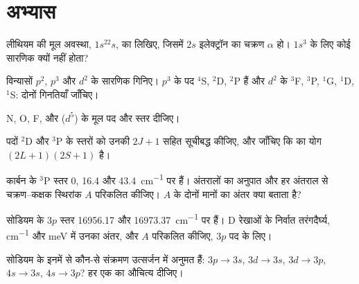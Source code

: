 \section{अभ्यास}

\begin{exercise}[$\star$]\label{exo:b3:many-electron-atoms:1}
लीथियम की मूल अवस्था, $1s^22s$, का  लिखिए, जिसमें
$2s$ इलेक्ट्रॉन का चक्रण $\alpha$ हो। $1s^3$ के लिए कोई सारणिक क्यों
नहीं होता?
\end{exercise}

\begin{exercise}[$\star$]\label{exo:b3:many-electron-atoms:2}
विन्यासों $p^2$, $p^3$ और $d^2$ के सारणिक गिनिए। $p^3$ के पद
${}^4$S, ${}^2$D, ${}^2$P हैं और $d^2$ के ${}^3$F, ${}^3$P, ${}^1$G,
${}^1$D, ${}^1$S: दोनों गिनतियाँ जाँचिए।
\end{exercise}

\begin{exercise}[$\star$]\label{exo:b3:many-electron-atoms:3}
N, O, F,  और  ($d^5$) के मूल पद और स्तर दीजिए।
\end{exercise}

\begin{exercise}[$\star$]\label{exo:b3:many-electron-atoms:4}
पदों ${}^2$D और ${}^3$P के स्तरों को उनकी  $2J+1$ सहित सूचीबद्ध कीजिए,
और जाँचिए कि  का योग $(2L+1)(2S+1)$ है।
\end{exercise}

\begin{exercise}[$\star\star$]\label{exo:b3:many-electron-atoms:5}
कार्बन के ${}^3$P स्तर 0, 16.4 और \qty{43.4}{cm^{-1}} पर हैं। अंतरालों का
अनुपात और हर अंतराल से चक्रण--कक्षक स्थिरांक $A$ परिकलित कीजिए।
$A$ के दोनों मानों का अंतर क्या बताता है?
\end{exercise}

\begin{exercise}[$\star\star$]\label{exo:b3:many-electron-atoms:6}
सोडियम के $3p$ स्तर 16956.17 और \qty{16973.37}{cm^{-1}} पर हैं।
D रेखाओं के निर्वात तरंगदैर्घ्य, \unit{cm^{-1}} और
\unit{meV} में उनका अंतर, और $A$ परिकलित कीजिए, $3p$ पद के लिए।
\end{exercise}

\begin{exercise}[$\star\star$]\label{exo:b3:many-electron-atoms:7}
सोडियम के इनमें से कौन-से संक्रमण उत्सर्जन में अनुमत हैं: $3p \to 3s$,
$3d \to 3s$, $3d \to 3p$, $4s \to 3s$, $4s \to 3p$? हर एक का औचित्य दीजिए।
\end{exercise}

